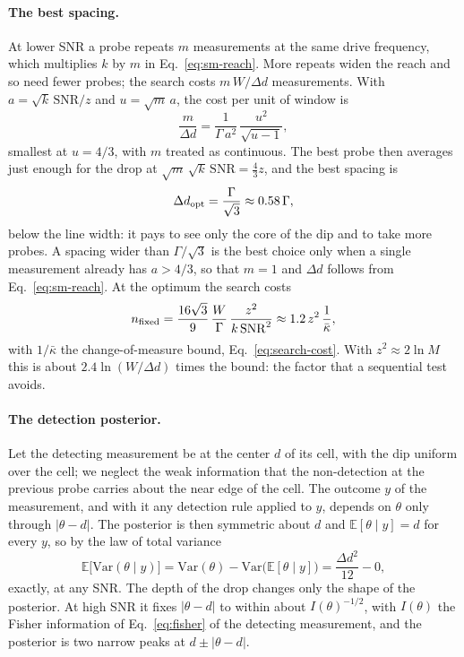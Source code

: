 \paragraph{The best spacing.} At lower SNR a probe repeats $m$ measurements at the same drive frequency, which
multiplies $k$ by $m$ in Eq.~\eqref{eq:sm-reach}. More repeats widen the reach and so need fewer probes; the search
costs $m\,W/\Delta d$ measurements. With $a=\sqrt k\,\mathrm{SNR}/z$ and $u=\sqrt m\,a$, the cost per unit of window
is
\begin{equation*}
  \frac{m}{\Delta d}=\frac{1}{\Gamma\,a^2}\,\frac{u^2}{\sqrt{u-1}},
\end{equation*}
smallest at $u=4/3$, with $m$ treated as continuous. The best probe then averages just enough for the drop at
$\sqrt m\,\sqrt k\,\mathrm{SNR}=\tfrac43z$, and the best spacing is
\begin{equation*}
  \Delta d_{\rm opt}=\frac{\Gamma}{\sqrt3}\approx0.58\,\Gamma,
\end{equation*}
below the line width: it pays to see only the core of the dip and to take more probes. A spacing wider than
$\Gamma/\sqrt3$ is the best choice only when a single measurement already has $a>4/3$, so that $m=1$ and
$\Delta d$ follows from Eq.~\eqref{eq:sm-reach}. At the optimum the search costs
\begin{equation}
  n_{\rm fixed}=\frac{16\sqrt3}{9}\,\frac{W}{\Gamma}\,\frac{z^2}{k\,\mathrm{SNR}^2}
  \approx1.2\,z^2\,\frac{1}{\bar\kappa},
  \label{eq:sm-fixed-cost}
\end{equation}
with $1/\bar\kappa$ the change-of-measure bound, Eq.~\eqref{eq:search-cost}. With $z^2\approx2\ln M$ this is about
$2.4\ln(W/\Delta d)$ times the bound: the factor that a sequential test avoids.

\paragraph{The detection posterior.} Let the detecting measurement be at the center $d$ of its cell, with the dip
uniform over the cell; we neglect the weak information that the non-detection at the previous probe carries about the
near edge of the cell. The outcome $y$ of the measurement, and with it any detection rule applied to $y$, depends on
$\theta$ only through $|\theta-d|$. The posterior is then symmetric about $d$ and $\mathbb E[\theta\mid y]=d$ for
every $y$, so by the law of total variance
\begin{equation*}
  \mathbb E\big[\mathrm{Var}(\theta\mid y)\big]=\mathrm{Var}(\theta)-\mathrm{Var}\big(\mathbb E[\theta\mid y]\big)
  =\frac{\Delta d^2}{12}-0 ,
\end{equation*}
exactly, at any SNR. The depth of the drop changes only the shape of the posterior. At high SNR it fixes
$|\theta-d|$ to within about $I(\theta)^{-1/2}$, with $I(\theta)$ the Fisher information of Eq.~\eqref{eq:fisher}
of the detecting measurement, and the posterior is two narrow peaks at $d\pm|\theta-d|$.

